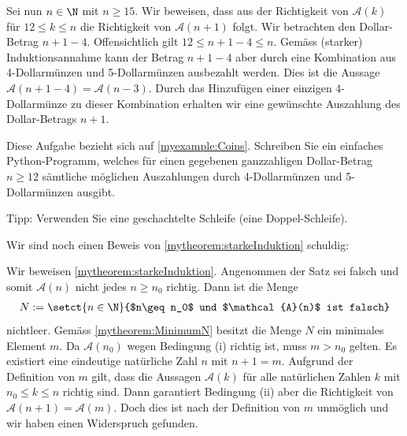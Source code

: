 \begin{myexample}
Sei nun $n\in\N$ mit $n\geq 15$. Wir beweisen, dass aus der Richtigkeit von $\mathcal{A}(k)$ für $12\leq k \leq n$ die Richtigkeit von $\mathcal{A}(n+1)$ folgt. Wir betrachten den Dollar-Betrag $n+1-4$. Offensichtlich gilt $12\leq n+1-4\leq n$. Gemäss (starker) Induktionsannahme kann der Betrag $n+1-4$ aber durch eine Kombination aus 4-Dollarmünzen und 5-Dollarmünzen ausbezahlt werden. Dies ist die Aussage $\mathcal{A}(n+1-4) = \mathcal{A}(n-3)$. Durch das Hinzufügen einer einzigen 4-Dollarmünze zu dieser Kombination erhalten wir eine gewünschte Auszahlung des Dollar-Betrags $n+1$.
\end{myexample}

\begin{myexercise}\label{myexercise:0208}
	Diese Aufgabe bezieht sich auf \cref{myexample:Coins}. Schreiben Sie ein einfaches Python-Programm, welches für einen gegebenen ganzzahligen Dollar-Betrag $n\geq 12$ sämtliche möglichen Auszahlungen durch 4-Dollarmünzen und 5-Dollarmünzen ausgibt.

	\noindent
	Tipp: Verwenden Sie eine geschachtelte Schleife (eine Doppel-Schleife).
\end{myexercise}

\noindent
Wir sind noch einen Beweis von \cref{mytheorem:starkeInduktion} schuldig:

\begin{myproof}
	Wir beweisen \cref{mytheorem:starkeInduktion}. Angenommen der Satz sei falsch und somit $\mathcal{A}(n)$ nicht jedes $n\geq n_0$ richtig. Dann ist die Menge
	\begin{align*}
		N := \setct{n\in\N}{$n\geq n_0$ und $\mathcal{A}(n)$ ist falsch}
	\end{align*}
	nichtleer. Gemäss \cref{mytheorem:MinimumN} besitzt die Menge $N$ ein minimales Element $m$. Da $\mathcal{A}(n_0)$ wegen Bedingung (i) richtig ist, muss $m>n_0$ gelten. Es existiert eine eindeutige natürliche Zahl $n$ mit $n+1 = m$. Aufgrund der Definition von $m$ gilt, dass die Aussagen $\mathcal{A}(k)$ für alle natürlichen Zahlen $k$ mit $n_0\leq k\leq n$ richtig sind. Dann garantiert Bedingung (ii) aber die Richtigkeit von $\mathcal{A}(n+1) = \mathcal{A}(m)$. Doch dies ist nach der Definition von $m$ unmöglich und wir haben einen Widerspruch gefunden.
\end{myproof}

